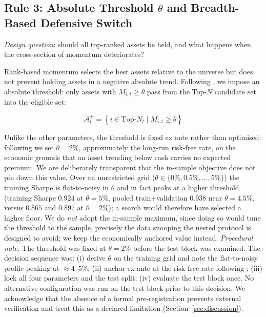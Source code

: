 \subsection{Rule 3: Absolute Threshold $\theta$ and Breadth-Based Defensive Switch}
\label{sec:theta}

\textit{Design question}: should all top-ranked assets be held, and what happens
when the cross-section of momentum deteriorates?

Rank-based momentum selects the best assets relative to the universe but
does not prevent holding assets in a negative absolute trend.
Following \citet{antonacci2014}, we impose an absolute threshold: only assets with
$M_{i,t} \geq \theta$ pass from the Top-$N$ candidate set into the eligible set:

\begin{equation}
\mathcal{A}_t^+ = \left\{i \in \text{Top-}N_t \;\big|\; M_{i,t} \geq \theta \right\}
\label{eq:eligible}
\end{equation}

Unlike the other parameters, the threshold is fixed ex ante rather than
optimised: following \citet{antonacci2014} we set $\theta = 2\%$, approximately the
long-run risk-free rate, on the economic grounds that an asset trending below cash
carries no expected premium. We are deliberately transparent that the in-sample
objective does not pin down this value. Over an unrestricted grid
($\theta \in \{0\%, 0.5\%, \ldots, 5\%\}$) the training Sharpe is flat-to-noisy in
$\theta$ and in fact peaks at a higher threshold (training Sharpe $0.924$ at
$\theta=5\%$, pooled train+validation $0.938$ near $\theta=4.5\%$, versus $0.865$ and
$0.897$ at $\theta=2\%$); a search would therefore have selected a higher floor. We
do \emph{not} adopt the in-sample maximum, since doing so would tune the threshold to
the sample, precisely the data snooping the nested protocol is designed to avoid;
we keep the economically anchored value instead.
\emph{Procedural note.} The threshold was fixed at $\theta = 2\%$ before the test
block was examined. The decision sequence was: (i) derive $\theta$ on the training
grid and note the flat-to-noisy profile peaking at $\approx 4$--$5\%$;
(ii) anchor ex ante at the risk-free rate following \citet{antonacci2014};
(iii) lock all four parameters and the test split; (iv) evaluate the test block
once. No alternative configuration was run on the test block prior to this
decision. We acknowledge that the absence of a formal pre-registration prevents
external verification and treat this as a declared limitation
(Section~\ref{sec:discussion}).

